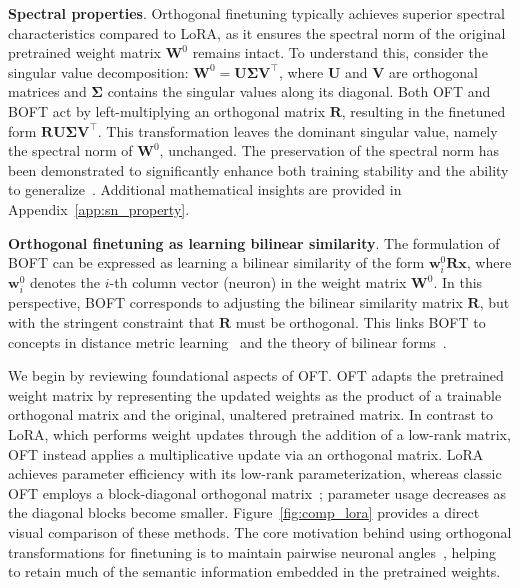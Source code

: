 \textbf{Spectral properties}. Orthogonal finetuning typically achieves superior spectral characteristics compared to LoRA, as it ensures the spectral norm of the original pretrained weight matrix $\bm{W}^0$ remains intact. To understand this, consider the singular value decomposition: $\bm{W}^0=\bm{U}\bm{\Sigma}\bm{V}^\top$, where $\bm{U}$ and $\bm{V}$ are orthogonal matrices and $\bm{\Sigma}$ contains the singular values along its diagonal. Both OFT and BOFT act by left-multiplying an orthogonal matrix $\bm{R}$, resulting in the finetuned form $\bm{R}\bm{U}\bm{\Sigma}\bm{V}^\top$. This transformation leaves the dominant singular value, namely the spectral norm of $\bm{W}^0$, unchanged. The preservation of the spectral norm has been demonstrated to significantly enhance both training stability and the ability to generalize~\cite{miyato2018spectral,yoshida2017spectral}. Additional mathematical insights are provided in Appendix~\ref{app:sn_property}.

\textbf{Orthogonal finetuning as learning bilinear similarity}. The formulation of BOFT can be expressed as learning a bilinear similarity of the form $\bm{w}^0_i\bm{R}\bm{x}$, where $\bm{w}^0_i$ denotes the $i$-th column vector (neuron) in the weight matrix $\bm{W}^0$. In this perspective, BOFT corresponds to adjusting the bilinear similarity matrix $\bm{R}$, but with the stringent constraint that $\bm{R}$ must be orthogonal. This links BOFT to concepts in distance metric learning~\cite{xing2002distance} and the theory of bilinear forms~\cite{roman2005advanced}.

We begin by reviewing foundational aspects of OFT. OFT adapts the pretrained weight matrix by representing the updated weights as the product of a trainable orthogonal matrix and the original, unaltered pretrained matrix. In contrast to LoRA, which performs weight updates through the addition of a low-rank matrix, OFT instead applies a multiplicative update via an orthogonal matrix. LoRA achieves parameter efficiency with its low-rank parameterization, whereas classic OFT employs a block-diagonal orthogonal matrix~\cite{qiu2023controlling}; parameter usage decreases as the diagonal blocks become smaller. Figure~\ref{fig:comp_lora} provides a direct visual comparison of these methods. The core motivation behind using orthogonal transformations for finetuning is to maintain pairwise neuronal angles~\cite{liu2018learning,liu2021orthogonal,qiu2023controlling}, helping to retain much of the semantic information embedded in the pretrained weights.

